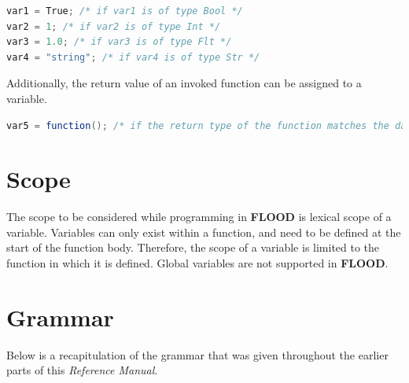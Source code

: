 \documentclass[12pt]{report}
\begin{document}
\begin{singlespace}
\begin{lstlisting}[language=Java,label=some-code,caption={Assignments}]
var1 = True; /* if var1 is of type Bool */
var2 = 1; /* if var2 is of type Int */
var3 = 1.0; /* if var3 is of type Flt */
var4 = "string"; /* if var4 is of type Str */
\end{lstlisting}
\end{singlespace}

Additionally, the return value of an invoked function can be assigned to a variable.

\begin{singlespace}
\begin{lstlisting}[language=Java,label=some-code,caption={Function assignment.}]
var5 = function(); /* if the return type of the function matches the data type of var5 */
\end{lstlisting}
\end{singlespace}

\section{Scope}

The scope to be considered while programming in \textbf{FLOOD} is lexical scope of a variable. Variables can only exist within a function, and need to be defined at the start of the function body. Therefore, the scope of a variable is limited to the function in which it is defined. Global variables are not supported in \textbf{FLOOD}.

\section{Grammar}

Below is a recapitulation of the grammar that was given throughout the earlier parts of this \textit{Reference Manual}.
\end{document}
